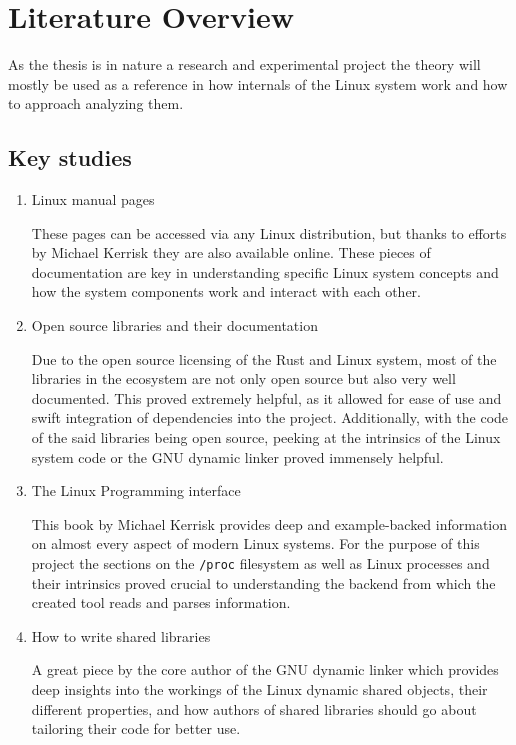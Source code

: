 \chapter{Literature Overview}
\label{cha:lit_overview}


As the thesis is in nature a research and experimental project the theory will mostly be used as a reference in how internals of the Linux system work and how to approach analyzing them.

\section{Key studies}

\begin{enumerate}
    \item {Linux manual pages}

    These pages can be accessed via any Linux distribution, but thanks to efforts by Michael Kerrisk they are also available online.
    These pieces of documentation are key in understanding specific Linux system concepts and how the system components work and interact with each other.

    \item {Open source libraries and their documentation}

    Due to the open source licensing of the Rust and Linux system, most of the libraries in the ecosystem are not only open source but also very well documented.
    This proved extremely helpful, as it allowed for ease of use and swift integration of dependencies into the project.
    Additionally, with the code of the said libraries being open source, peeking at the intrinsics of the Linux system code or the GNU dynamic linker \cite{noauthor_sourcewareorg_nodate} proved immensely helpful.

    \item {The Linux Programming interface \cite{kerrisk_linux_2010}}

    This book by Michael Kerrisk provides deep and example-backed information on almost every aspect of modern Linux systems.
    For the purpose of this project the sections on the \verb|/proc| filesystem as well as Linux processes and their intrinsics proved crucial to understanding the backend from which the created tool reads and parses information.

    \item{How to write shared libraries \cite{drepper_how_2011}}

    A great piece by the core author of the GNU dynamic linker which provides deep insights into the workings of the Linux dynamic shared objects, their different properties, and how authors of shared libraries should go about tailoring their code for better use.

\end{enumerate}

